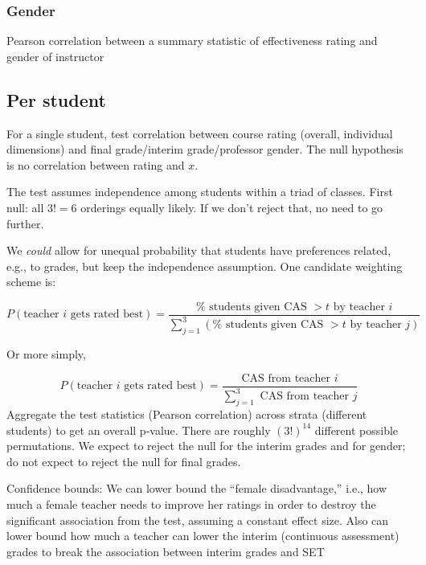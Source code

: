 \documentclass[12pt]{article}
\newcommand{\todo}[1]{{\color{red}{TO DO: \sc #1}}}
\begin{document}
\subsubsection{Gender}
Pearson correlation between a summary statistic of effectiveness rating and gender of instructor
\todo{code is ready.  Do we do all metrics?}

\subsection{Per student}
For a single student, test correlation between course rating (overall, individual dimensions) and final grade/interim grade/professor gender.
The null hypothesis is no correlation between rating and $x$.

The test assumes independence among students within a triad of classes.
First null: all $3! = 6$ orderings equally likely.
If we don't reject that, no need to go further.

We \emph{could} allow for unequal probability that students have preferences
related, e.g., to grades, but keep the independence assumption.
One candidate weighting scheme is:

$$P(\text{teacher $i$ gets rated best}) = \frac{\%\text{ students given CAS }> t\text{ by teacher $i$}}{\sum_{j=1}^3(\%\text{ students given CAS }> t\text{ by teacher }j)}$$
 
Or more simply, 

$$P(\text{teacher $i$ gets rated best}) = \frac{\text{CAS from teacher $i$}}{\sum_{j=1}^3\text{ CAS from teacher }j}$$
Aggregate the test statistics (Pearson correlation) across strata (different students) to get an overall p-value.  There are roughly $(3!)^{14}$ different possible permutations.
We expect to reject the null for the interim grades and for gender; do not expect to reject the null for final grades.
 
Confidence bounds:
We can lower bound the ``female disadvantage,'' i.e., 
how much a female teacher needs to improve her ratings in order to destroy the 
significant association from the test, assuming a constant effect size.
Also can lower bound how much a teacher can lower the interim (continuous assessment) grades to break the association between interim grades and SET
\end{document}
